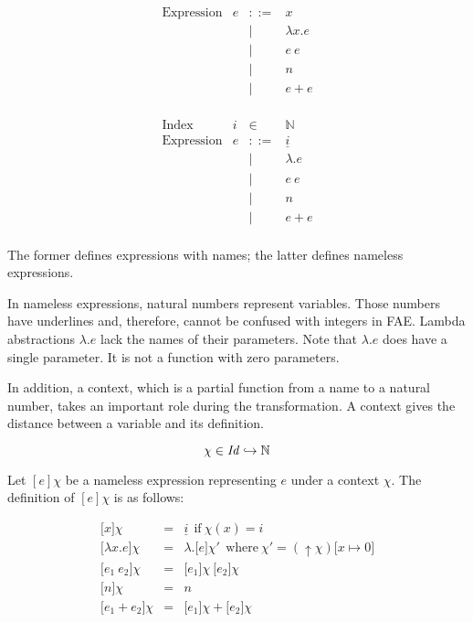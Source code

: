 \[
\begin{array}{lrcl}
\text{Expression} & e & ::= & x \\
&&|& \lambda x.e \\
&&|& e\ e \\
&&|& n \\
&&|& e+e \\
\end{array}
\]

\[
\begin{array}{lrcl}
\text{Index} & i & \in & \mathbb{N} \\
\text{Expression} & e & ::= & \underline{i} \\
&&|& \lambda.e \\
&&|& e\ e \\
&&|& n \\
&&|& e+e \\
\end{array}
\]

The former defines expressions with names; the latter defines nameless
expressions.

In nameless expressions, natural numbers represent variables. Those numbers have
underlines and, therefore, cannot be confused with integers in FAE. Lambda
abstractions $\lambda.e$ lack the names of their parameters. Note that
$\lambda.e$ does have a single parameter. It is not a function with zero
parameters.

In addition, a context, which is a partial function from a name to a natural
number, takes an important role during the transformation. A context gives the
distance between a variable and its definition.

\[\chi\in\mbox{\emph{Id}}\hookrightarrow\mathbb{N}\]

Let $[e]\chi$ be a nameless expression representing $e$ under a context $\chi$.
The definition of $[e]\chi$ is as follows:

\[
\begin{array}{rcl}
\lbrack x\rbrack \chi &=& \underline{i}\ \ \text{if}\ \chi(x)=i \\
\lbrack \lambda x.e\rbrack \chi &=& \lambda.\lbrack e\rbrack {\chi'}\ \ \text{where}\
\chi'=(\uparrow\chi)\lbrack x\mapsto 0\rbrack  \\
\lbrack e_1\ e_2\rbrack \chi &=& \lbrack e_1\rbrack \chi\ \lbrack e_2\rbrack \chi \\
\lbrack n\rbrack \chi &=& n \\
\lbrack e_1+e_2\rbrack \chi &=& \lbrack e_1\rbrack \chi+\lbrack e_2\rbrack \chi \\
\end{array}
\]

